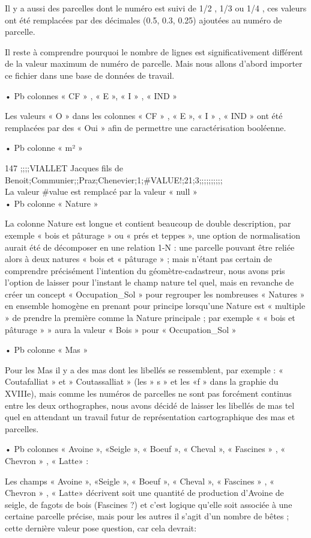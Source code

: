 Il y a aussi des parcelles dont le numéro est suivi de 1/2 , 1/3 ou 1/4 , ces valeurs ont été remplacées par des décimales (0.5, 0.3, 0.25) ajoutées au numéro de parcelle.

Il reste à comprendre pourquoi le nombre de lignes est significativement différent de la valeur maximum de numéro de parcelle. Mais nous allons d’abord importer ce fichier dans une base de données de travail.

•	Pb colonnes « CF » , « E », « I » , « IND »

Les valeurs « O » dans les colonnes « CF » , « E », « I » , « IND » ont été remplacées par des « Oui » afin de permettre une caractérisation booléenne.

•	Pb colonne « m² »

147 ;;;;VIALLET Jacques fils de Benoit;Communier;;Praz;Chenevier;1;\#VALUE!;21;3;;;;;;;;;;\\
La valeur \#value est remplacé par la valeur « null » \\
•	Pb colonne « Nature »

La colonne Nature est longue et contient beaucoup de double description, par exemple « bois et pâturage » ou « prés et teppes », une option de normalisation aurait été de décomposer en une relation 1-N : une parcelle pouvant être reliée alors à deux natures « bois et « pâturage » ; mais n’étant pas certain de comprendre précisément l’intention du géomètre-cadastreur, nous avons pris l’option de laisser pour l’instant le champ nature tel quel, mais en revanche de créer un concept « Occupation_Sol » pour regrouper les nombreuses « Natures » en ensemble homogène en prenant pour principe lorsqu’une Nature est « multiple » de prendre la première comme la Nature principale ; par exemple « « bois et pâturage » » aura la valeur « Bois » pour « Occupation_Sol »

•	Pb colonne « Mas »

Pour les Mas il y a des mas dont les libellés se ressemblent, par exemple : « Coutafalliat » et » Coutassalliat » (les » s » et les «f » dans la graphie du XVIIIe), mais comme les numéros de parcelles ne sont pas forcément continus entre les deux orthographes, nous avons décidé de laisser les libellés de mas tel quel en attendant un travail futur de représentation cartographique des mas et parcelles.

•	Pb colonnes « Avoine », «Seigle », « Boeuf », « Cheval », « Fascines » , « Chevron » , « Latte» :

Les champs « Avoine », «Seigle », « Boeuf », « Cheval », « Fascines » , « Chevron » , « Latte» décrivent soit une quantité de production d’Avoine de seigle, de fagots de bois (Fascines ?) et c’est logique qu’elle soit associée à une certaine parcelle précise, mais pour les autres il s’agit d’un nombre de bêtes ; cette dernière valeur pose question, car cela devrait:

